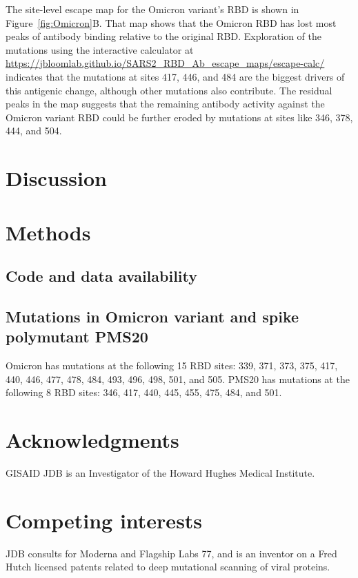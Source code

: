 \documentclass[9pt,twocolumn,twoside]{gsajnl_modified}
\begin{document}
The site-level escape map for the Omicron variant's RBD is shown in Figure~\ref{fig:Omicron}B.
That map shows that the Omicron RBD has lost most peaks of antibody binding relative to the original RBD.
Exploration of the mutations using the interactive calculator at \url{https://jbloomlab.github.io/SARS2_RBD_Ab_escape_maps/escape-calc/} indicates that the mutations at sites 417, 446, and 484 are the biggest drivers of this antigenic change, although other mutations also contribute.
The residual peaks in the map suggests that the remaining antibody activity against the Omicron variant RBD could be further eroded by mutations at sites like 346, 378, 444, and 504.

\section{Discussion}


{\small

\section{Methods}
\subsection{Code and data availability}

\subsection{Mutations in Omicron variant and spike polymutant PMS20}
Omicron has mutations at the following 15 RBD sites: 339, 371, 373, 375, 417, 440, 446, 477, 478, 484, 493, 496, 498, 501, and 505.
PMS20 has mutations at the following 8 RBD sites: 346, 417, 440, 445, 455, 475, 484, and 501.


\section{Acknowledgments}
{\color{red} GISAID}
JDB is an Investigator of the Howard Hughes Medical Institute.

\section{Competing interests}
JDB consults for Moderna and Flagship Labs 77, and is an inventor on a Fred Hutch licensed patents related to deep mutational scanning of viral proteins.

}


\end{document}
